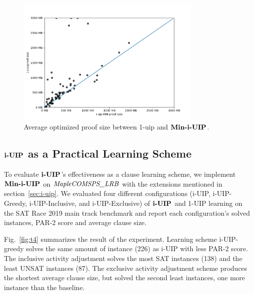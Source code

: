 \begin{figure}
    \centering
    \includegraphics[width=0.8\textwidth,natwidth=610,natheight=642]{proof_size_compare.png}
    \caption{Average optimized proof size between 1-uip and $\textbf{Min-i-UIP}$.}
    \label{fig:proof_compare}
\end{figure}

\subsection{$\textbf{i-UIP}$ as a Practical Learning Scheme}
To evaluate $\textbf{i-UIP}$'s effectiveness as a clause learning scheme, we implement $\textbf{Min-i-UIP}$ on $\textit{MapleCOMSPS\_LRB}$ with the extensions mentioned in section~\ref{sec:i-uip}. We evaluated four different configurations (i-UIP, i-UIP-Greedy, i-UIP-Inclusive, and i-UIP-Exclusive) of $\textbf{i-UIP}$ and 1-UIP learning on the SAT Race 2019 main track benchmark and report each configuration's solved instances, PAR-2 score and average clause size. 

Fig.~\ref{fig:t4} summarizes the result of the experiment. Learning scheme i-UIP-greedy solves the same amount of instance (226) as i-UIP with less PAR-2 score. The inclusive activity adjustment solves the most SAT instances (138) and the least UNSAT instances (87). The exclusive activity adjustment scheme produces the shortest average clause size, but solved the second least instances, one more instance than the baseline.  

